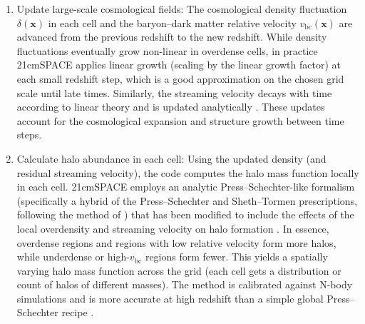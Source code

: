 \documentclass[floats,floatfix,showpacs,amssymb,prd,superscriptaddress,nofootinbib]{revtex4-2} %
\begin{document}
\begin{enumerate}
    \item Update large-scale cosmological fields: The cosmological density fluctuation $\delta(\mathbf{x})$ in each cell and the baryon–dark matter relative velocity $v_{\text{bc}}(\mathbf{x})$ are advanced from the previous redshift to the new redshift. While density fluctuations eventually grow non-linear in overdense cells, in practice 21cmSPACE applies linear growth (scaling by the linear growth factor) at each small redshift step, which is a good approximation on the chosen grid scale until late times. Similarly, the streaming velocity decays with time according to linear theory and is updated analytically \citep{gessey-jones_2024}. These updates account for the cosmological expansion and structure growth between time steps.

    \item Calculate halo abundance in each cell: Using the updated density (and residual streaming velocity), the code computes the halo mass function locally in each cell. 21cmSPACE employs an analytic Press–Schechter-like formalism (specifically a hybrid of the Press–Schechter \citep{Press_Schechter_1974} and Sheth–Tormen \citep{Sheth_Tormen_1999} prescriptions, following the method of \citet{Barkana_Loeb_2001}) that has been modified to include the effects of the local overdensity and streaming velocity on halo formation \citep{gessey-jones_2024}. In essence, overdense regions and regions with low relative velocity form more halos, while underdense or high-$v_{\text{bc}}$ regions form fewer. This yields a spatially varying halo mass function across the grid (each cell gets a distribution or count of halos of different masses). The method is calibrated against N-body simulations and is more accurate at high redshift than a simple global Press–Schechter recipe \citep{gessey-jones_2024}.


\end{enumerate}
\end{document}
